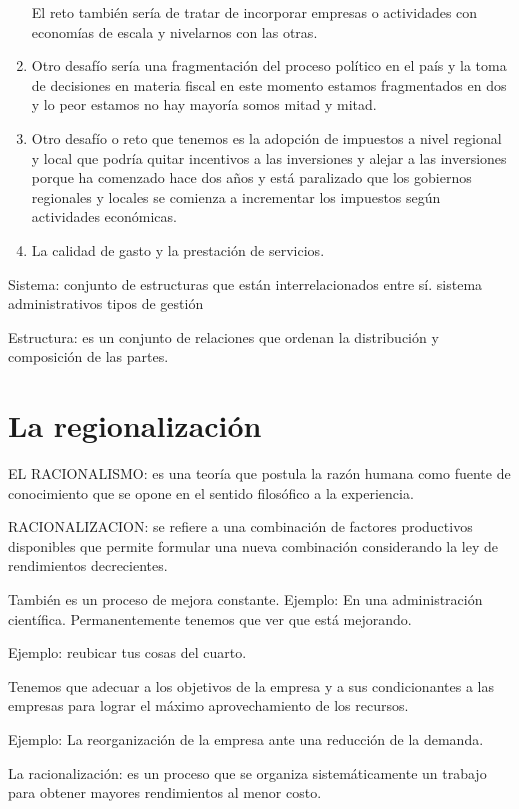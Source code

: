 \documentclass[
  letterpaper,
  DIV=11,
  numbers=noendperiod]{scrartcl}
\begin{document}
\begin{enumerate}
  El reto también sería de tratar de incorporar empresas o actividades
  con economías de escala y nivelarnos con las otras.
\item
  Otro desafío sería una fragmentación del proceso político en el país y
  la toma de decisiones en materia fiscal en este momento estamos
  fragmentados en dos y lo peor estamos no hay mayoría somos mitad y
  mitad.
\item
  Otro desafío o reto que tenemos es la adopción de impuestos a nivel
  regional y local que podría quitar incentivos a las inversiones y
  alejar a las inversiones porque ha comenzado hace dos años y está
  paralizado que los gobiernos regionales y locales se comienza a
  incrementar los impuestos según actividades económicas.
\item
  La calidad de gasto y la prestación de servicios.
\end{enumerate}

Sistema: conjunto de estructuras que están interrelacionados entre sí.
sistema administrativos tipos de gestión

Estructura: es un conjunto de relaciones que ordenan la distribución y
composición de las partes.

\hypertarget{la-regionalizaciuxf3n}{%
\section{La regionalización}\label{la-regionalizaciuxf3n}}

EL RACIONALISMO: es una teoría que postula la razón humana como fuente
de conocimiento que se opone en el sentido filosófico a la experiencia.

RACIONALIZACION: se refiere a una combinación de factores productivos
disponibles que permite formular una nueva combinación considerando la
ley de rendimientos decrecientes.

También es un proceso de mejora constante. Ejemplo: En una
administración científica. Permanentemente tenemos que ver que está
mejorando.

Ejemplo: reubicar tus cosas del cuarto.

Tenemos que adecuar a los objetivos de la empresa y a sus condicionantes
a las empresas para lograr el máximo aprovechamiento de los recursos.

Ejemplo: La reorganización de la empresa ante una reducción de la
demanda.

La racionalización: es un proceso que se organiza sistemáticamente un
trabajo para obtener mayores rendimientos al menor costo.
\end{document}
